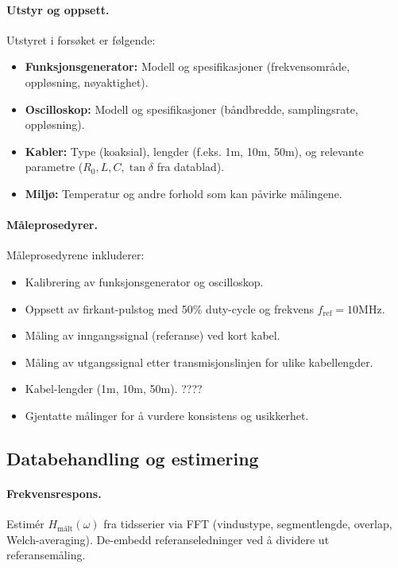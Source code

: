 \paragraph{Utstyr og oppsett.}
Utstyret i forsøket er følgende:
\begin{itemize}
    \item \textbf{Funksjonsgenerator:} Modell og spesifikasjoner (frekvensområde, oppløsning, nøyaktighet).
    \item \textbf{Oscilloskop:} Modell og spesifikasjoner (båndbredde, samplingsrate, oppløsning).
    \item \textbf{Kabler:} Type (koaksial), lengder (f.eks. 1m, 10m, 50m), og relevante parametre ($R_0,L,C,\tan\delta$ fra datablad).
    \item \textbf{Miljø:} Temperatur og andre forhold som kan påvirke målingene.
\end{itemize}

\paragraph{Måleprosedyrer.}
Måleprosedyrene inkluderer:
\begin{itemize}
    \item Kalibrering av funksjonsgenerator og oscilloskop.
    \item Oppsett av firkant-pulstog med 50\% duty-cycle og frekvens $f_\mathrm{ref} = 10 \mathrm{MHz}$.
    \item Måling av inngangssignal (referanse) ved kort kabel.
    \item Måling av utgangssignal etter transmisjonslinjen for ulike kabellengder.
    \item Kabel-lengder (1m, 10m, 50m). ????
    \item Gjentatte målinger for å vurdere konsistens og usikkerhet.
\end{itemize}



\subsection{Databehandling og estimering}
\paragraph{Frekvensrespons.}
Estimér $H_\text{målt}(\omega)$ fra tidsserier via FFT (vindustype, segmentlengde, overlap, Welch-averaging). De-embedd referanseledninger ved å dividere ut referansemåling.

